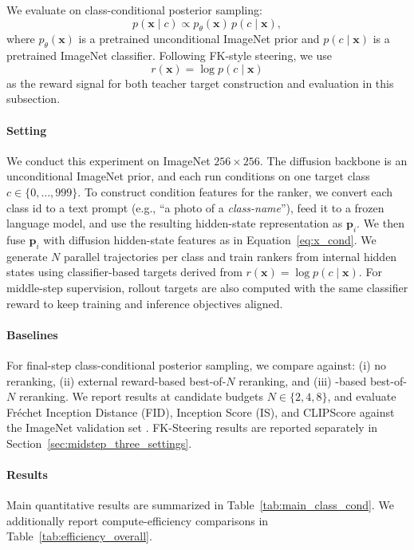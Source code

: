 \documentclass{article}
\newcommand{\method}{\text{Diffusion Ranker}\xspace}
\begin{document}
We evaluate \method on class-conditional posterior sampling:
\begin{equation}
    p(\mathbf{x}\mid c) \propto p_{\theta}(\mathbf{x})\,p(c\mid \mathbf{x}),
\end{equation}
where \(p_{\theta}(\mathbf{x})\) is a pretrained unconditional ImageNet prior and \(p(c\mid \mathbf{x})\) is a pretrained ImageNet classifier. Following FK-style steering, we use
\begin{equation}
    r(\mathbf{x})=\log p(c\mid \mathbf{x})
\end{equation}
as the reward signal for both teacher target construction and evaluation in this subsection.

\paragraph{Setting}
We conduct this experiment on ImageNet \(256\times256\). The diffusion backbone is an unconditional ImageNet prior, and each run conditions on one target class \(c\in\{0,\dots,999\}\). To construct condition features for the ranker, we convert each class id to a text prompt (e.g., ``a photo of a \emph{class-name}''), feed it to a frozen language model, and use the resulting hidden-state representation as \(\mathbf{p}_i\). We then fuse \(\mathbf{p}_i\) with diffusion hidden-state features as in Equation~\ref{eq:x_cond}. We generate \(N\) parallel trajectories per class and train rankers from internal hidden states using classifier-based targets derived from \(r(\mathbf{x})=\log p(c\mid \mathbf{x})\). For middle-step supervision, rollout targets are also computed with the same classifier reward to keep training and inference objectives aligned.

\paragraph{Baselines}
For final-step class-conditional posterior sampling, we compare against: (i) no reranking, (ii) external reward-based best-of-$N$ reranking, and (iii) \method-based best-of-$N$ reranking. We report results at candidate budgets \(N\in\{2,4,8\}\), and evaluate Fr\'echet Inception Distance (FID), Inception Score (IS), and CLIPScore against the ImageNet validation set \citep{russakovsky2015imagenet}. FK-Steering results are reported separately in Section~\ref{sec:midstep_three_settings}.

\paragraph{Results}
Main quantitative results are summarized in Table~\ref{tab:main_class_cond}. We additionally report compute-efficiency comparisons in Table~\ref{tab:efficiency_overall}.
\end{document}
